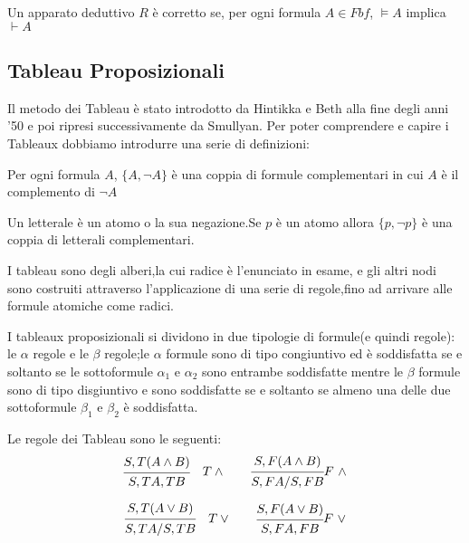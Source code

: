 \begin{thm}
    Un apparato deduttivo $R$ è corretto se, per ogni formula $A \in Fbf$, $\models A$
    implica $\vdash A$
\end{thm}
\subsection{Tableau Proposizionali}
Il metodo dei Tableau è stato introdotto da Hintikka e Beth alla fine degli anni '50
e poi ripresi successivamente da Smullyan.
Per poter comprendere e capire i Tableaux dobbiamo introdurre una serie di definizioni:
\begin{defi}
Per ogni formula $A$, $\{A,\neg A\}$ è una coppia di formule complementari in cui
$A$ è il complemento di $\neg A$
\end{defi}

\begin{defi}
Un letterale è un atomo o la sua negazione.Se $p$ è un atomo allora $\{p,\neg p\}$
è una coppia di letterali complementari.
\end{defi}

I tableau sono degli alberi,la cui radice è l'enunciato in esame, e gli altri nodi
sono costruiti attraverso l'applicazione di una serie di regole,fino ad arrivare
alle formule atomiche come radici.

I tableaux proposizionali si dividono in due tipologie di formule(e quindi regole):
le $\alpha$ regole e le $\beta$ regole;le $\alpha$ formule sono di tipo congiuntivo
ed è soddisfatta se e soltanto se le sottoformule $\alpha_1$ e $\alpha_2$ sono entrambe soddisfatte
mentre le $\beta$ formule sono di tipo disgiuntivo e sono soddisfatte se e soltanto
se almeno una delle due sottoformule $\beta_1$ e $\beta_2$ è soddisfatta.

Le regole dei Tableau sono le seguenti:
\begin{equation*}
\begin{prooftree}
\hypo{S,T (A \land B)}
\infer1 {S,TA,TB}
\end{prooftree}
\quad T \land \qquad
\begin{prooftree}
\hypo{S,F (A \land B)}
\infer1 {S,FA/S,FB}
\end{prooftree}
F \ \land
\end{equation*}

\begin{equation*}
\begin{prooftree}
\hypo{S,T (A \lor B)}
\infer1 {S,TA / S,TB}
\end{prooftree}
\quad T \lor \qquad
\begin{prooftree}
\hypo{S,F (A \lor B)}
\infer1 {S,FA,FB}
\end{prooftree}
F \ \lor
\end{equation*}

